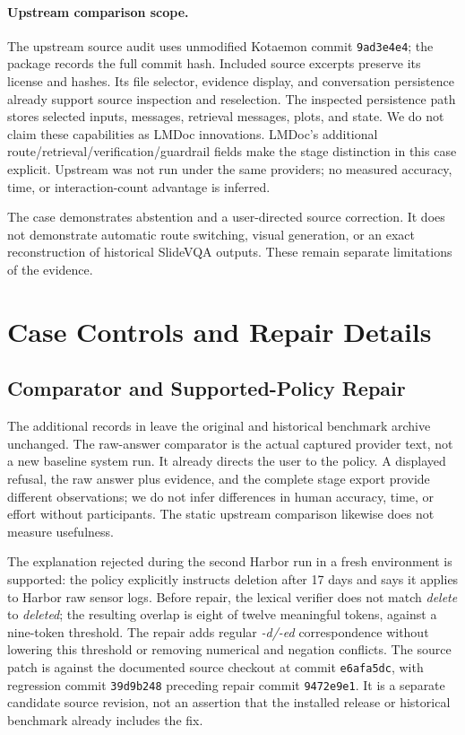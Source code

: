 \paragraph{Upstream comparison scope.}
The upstream source audit uses unmodified Kotaemon commit \texttt{9ad3e4e4}; the package records the full commit hash. Included source excerpts preserve its license and hashes. Its file selector, evidence display, and conversation persistence already support source inspection and reselection. The inspected persistence path stores selected inputs, messages, retrieval messages, plots, and state. We do not claim these capabilities as LMDoc innovations. LMDoc's additional route/retrieval/verification/guardrail fields make the stage distinction in this case explicit. Upstream was not run under the same providers; no measured accuracy, time, or interaction-count advantage is inferred.

The case demonstrates abstention and a user-directed source correction. It does not demonstrate automatic route switching, visual generation, or an exact reconstruction of historical SlideVQA outputs. These remain separate limitations of the evidence.


\section{Case Controls and Repair Details}
\label{app:followup}
\subsection{Comparator and Supported-Policy Repair}
The additional records in  leave the original  and historical benchmark archive unchanged. The raw-answer comparator is the actual captured provider text, not a new baseline system run. It already directs the user to the policy. A displayed refusal, the raw answer plus evidence, and the complete stage export provide different observations; we do not infer differences in human accuracy, time, or effort without participants. The static upstream comparison likewise does not measure usefulness.

The explanation rejected during the second Harbor run in a fresh environment is supported: the policy explicitly instructs deletion after 17 days and says it applies to Harbor raw sensor logs. Before repair, the lexical verifier does not match \emph{delete} to \emph{deleted}; the resulting overlap is eight of twelve meaningful tokens, against a nine-token threshold. The repair adds regular \emph{-d/-ed} correspondence without lowering this threshold or removing numerical and negation conflicts. The source patch is against the documented source checkout at commit \texttt{e6afa5dc}, with regression commit \texttt{39d9b248} preceding repair commit \texttt{9472e9e1}. It is a separate candidate source revision, not an assertion that the installed release or historical benchmark already includes the fix.

